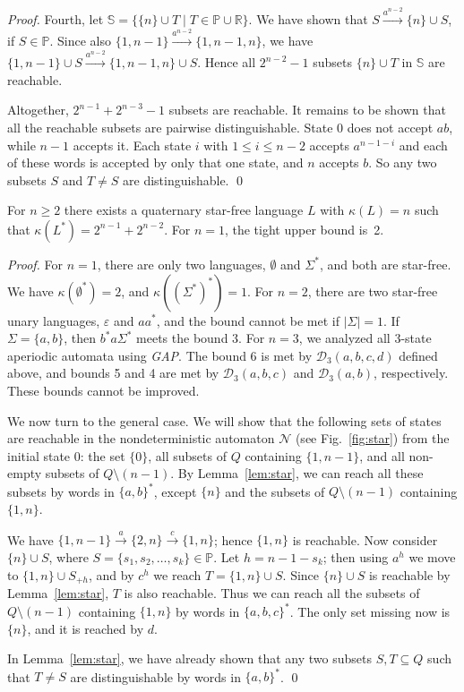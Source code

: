 \documentclass{llncs}
\renewcommand{\le}{\leqslant}
\renewcommand{\ge}{\geqslant}
\newcommand{\eps}{\varepsilon}
\newcommand{\emp}{\emptyset}
\newcommand{\Sig}{\Sigma}
\newcommand{\cD}{{\mathcal D}}
\newcommand{\cN}{{\mathcal N}}
\begin{document}
\begin{proof}
Fourth, let $\mathbb{S}= \{\{n\}\cup T \mid T\in \mathbb{P}\cup  \mathbb{R}\} $. We have shown that 
$S\stackrel{a^{n-2}}{\rightarrow} \{n\}\cup S$, if $S\in  \mathbb{P}$.
Since also 
$\{1,n-1\}\stackrel{a^{n-2}}{\rightarrow} \{1,n-1,n\}$, we have
$\{1,n-1\}\cup S \stackrel{a^{n-2}}{\rightarrow} \{1,n-1,n\}\cup S$.
Hence all $2^{n-2}-1$ subsets $\{n\}\cup T$ in $\mathbb{S}$ are reachable.

Altogether, $2^{n-1}+2^{n-3}-1$ subsets are reachable.
It remains to be shown that all the reachable subsets are pairwise distinguishable. 
State 0 does not accept $ab$, while $n-1$ accepts it. 
Each state 
$i$ with $1\le i\le n-2$ accepts $a^{n-1-i}$ and each of these words is  accepted by only that one state, and $n$ accepts $b$. So any two subsets $S$ and $T\neq S$ are distinguishable.
\qed
\end{proof}

\begin{theorem}
\label{thm:stars}
For $n\ge 2$ there exists a quaternary star-free language $L$ with $\kappa(L)=n$ such that $\kappa(L^*)=2^{n-1}+2^{n-2}$.
For $n=1$,  the tight upper bound is~2. 
\end{theorem}
\begin{proof}
For $n=1$, there are only two languages, $\emp$ and $\Sig^*$, and both are star-free. We have $\kappa(\emp^*)=2$, and $\kappa((\Sig^*)^*)=1$. For $n=2$, there are two star-free unary languages, $\eps$ and $aa^*$, and the bound cannot be met if $|\Sig|=1$.  If $\Sig=\{a,b\}$, then $b^*a\Sig^*$ meets the bound $3$.
For $n=3$, we analyzed all 3-state aperiodic automata using \emph{GAP}.
The bound 6 is met by $\cD_{3}(a,b,c,d)$ defined above, and  bounds 5 and 4 are met by $\cD_3(a,b,c)$  and $\cD_3(a,b)$, respectively.
These bounds cannot be improved.

We now turn to  the general case. 
We will show that the following sets of states are reachable in  the nondeterministic automaton $\cN$ (see Fig.~\ref{fig:star}) from the initial state 0: the set $\{0\}$, all subsets of $Q$ containing $\{1,n-1\}$, and all  
 non-empty subsets of $Q\setminus (n-1)$.
By Lemma~\ref{lem:star}, we can reach 
all these subsets by words in $\{a,b\}^*$, except 
$\{n\}$ and the subsets of $Q\setminus (n-1)$ containing $\{1,n\}$.

We have
$\{1,n-1\} \stackrel{a}{\rightarrow} \{2,n\} \stackrel{c}{\rightarrow} \{1,n\}$; hence $\{1,n\}$ is reachable.
Now consider $\{n\}\cup S$, where $S=\{s_1,s_2,\ldots, s_{k}\} \in \mathbb{P}$.
Let $h= n-1-s_{k}$; then using $a^h$ we move to 
 $\{1,n\}\cup S_{+h}$,  and by $c^h$ we reach
$T=\{1, n\}\cup S$. Since $\{n\}\cup S$ is reachable by Lemma~\ref{lem:star}, $T$ is also reachable. Thus we can reach all the subsets of $Q\setminus (n-1)$ containing $\{1,n\}$ by words in $\{a,b,c\}^*$.
The only set missing now is $\{n\}$, and it is reached by $d$.

In Lemma~\ref{lem:star}, we have already shown that any two subsets $S,T\subseteq Q$ such that $T\neq S$ are distinguishable by words in $\{a,b\}^*$.
\qed
\end{proof}
\end{document}
